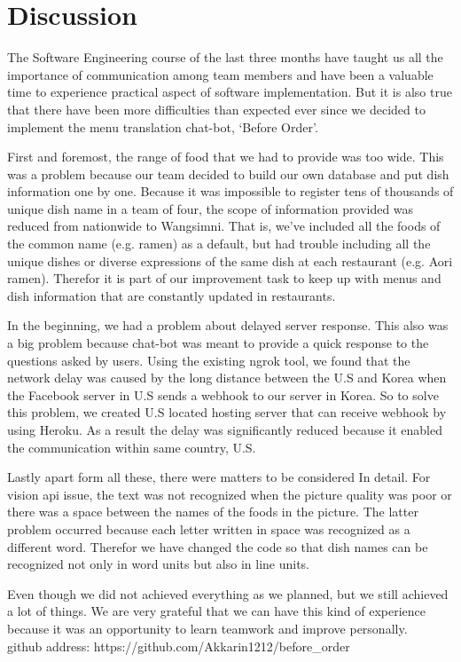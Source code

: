 \section{Discussion}

The Software Engineering course of the last three months have taught us all the importance of communication among team members and have been a valuable time to experience practical aspect of software implementation. But it is also true that there have been more difficulties than expected ever since we decided to implement the menu translation chat-bot, ‘Before Order’.

 First and foremost, the range of food that we had to provide was too wide. This was a problem because our team decided to build our own database and put dish information one by one. Because it was impossible to register tens of thousands of unique dish name in a team of four, the scope of information provided was reduced from nationwide to Wangsimni. That is, we’ve included all the foods of the common name (e.g. ramen) as a default, but had trouble including all the unique dishes or diverse expressions of the same dish at each restaurant (e.g. Aori ramen). Therefor it is part of our improvement task to keep up with menus and dish information that are constantly updated in restaurants. 

 In the beginning, we had a problem about delayed server response. This also was a big problem because chat-bot was meant to provide a quick response to the questions asked by users. Using the existing ngrok tool, we found that the network delay was caused by the long distance between the U.S and Korea when the Facebook server in U.S sends a webhook to our server in Korea. So to solve this problem, we created U.S located hosting server that can receive webhook by using Heroku. As a result the delay was significantly reduced because it enabled the communication within same country, U.S.

 Lastly apart form all these, there were matters to be considered In detail. For vision api issue, the text was not recognized when the picture quality was poor or there was a space between the names of the foods in the picture. The latter problem occurred because each letter written in space was recognized as a different word. Therefor we have changed the code so that dish names can be recognized not only in word units but also in line units.

 Even though we did not achieved everything as we planned, but we still achieved a lot of things. We are very grateful that we can have this kind of experience because it was an opportunity to learn teamwork and improve personally. \\


 github address: https://github.com/Akkarin1212/before\_order